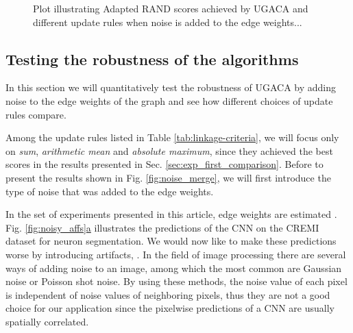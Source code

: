 \begin{figure}
\caption{Plot illustrating Adapted RAND scores achieved by UGACA and different update rules when noise is added to the edge weights... }\label{fig:noise_plots}
\end{figure}


\subsection{Testing the robustness of the algorithms}
 In this section we will quantitatively test the robustness of UGACA by adding noise to the edge weights of the graph and see how different choices of update rules compare.

 Among the update rules listed in Table \ref{tab:linkage-criteria}, we will focus only on \emph{sum}, \emph{arithmetic mean} and \emph{absolute maximum}, since they achieved the best scores in the results presented in Sec. \ref{sec:exp_first_comparison}. Before to present the results shown in Fig. \ref{fig:noise_merge}, we will first introduce the type of noise that was added to the edge weights.

 In the set of experiments presented in this article, edge weights are estimated . Fig. \hyperref[fig:noisy_affs]{\ref*{fig:noisy_affs}a} illustrates the predictions of the CNN on the CREMI dataset for neuron segmentation. We would now like to make these predictions worse by introducing  artifacts, . In the field of image processing there are several ways of adding noise to an image, among which the most common are Gaussian noise or Poisson shot noise. By using these methods, the noise value of each pixel is independent of noise values of neighboring pixels, thus they are not a good choice for our application since the pixelwise predictions of a CNN are usually spatially correlated. 

